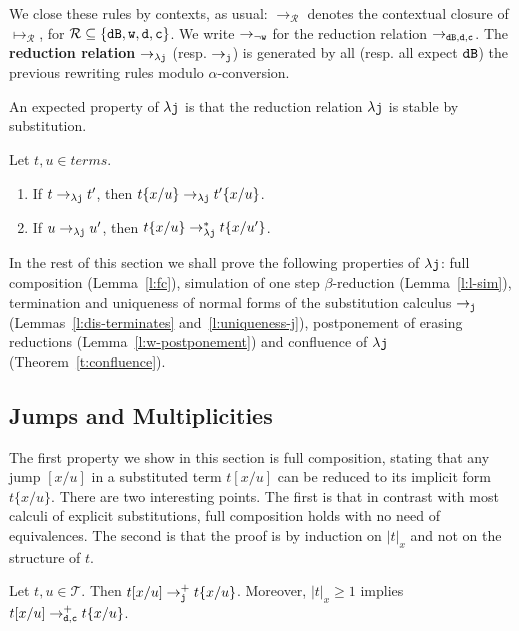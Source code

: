 \documentclass{LMCS}
\renewcommand{\>}{\rightarrow}
\def\lam{\lambda}
\newcommand{\Rew}[1]{\rightarrow_{#1}}
\newcommand{\rRew}[1]{\mapsto_{#1}}
\newcommand{\Rewn}[2][*]{\rightarrow^{#1}_{#2}}
\newcommand{\isubs}[1]{ \{ #1  \} }
\newcommand{\B}{{\tt dB}}
\newcommand{\R}{\mathcal{R}}
\newcommand{\dis}{{\tt j}}
\newcommand{\ldis}{\lam{\dis}}
\newcommand{\lj}{\lam{\dis}}
\newcommand{\Rewplus}[1]{\rightarrow^{+}_{#1}}
\newcommand{\Var}{{\tt d}}
\newcommand{\DSubs}{{\tt c}}
\newcommand{\Gc}{{\tt w}}
\newcommand{\set}[1]{ \{ #1 \}}
\newcommand{\terms}{\mathcal{T}}
\newcommand{\deft}[1]{{\bf #1}}
\newcommand{\nGc}{{\neg\Gc}}
\begin{document}
We close these rules by contexts, as usual:
$\Rew{\R}$ denotes the contextual closure of $\rRew{\R}$, for $\R
\subseteq \set{\B,\Gc,\Var,\DSubs}$. We write $\Rew{\nGc}$ for the
reduction relation $\Rew{\B,\Var,\DSubs}$.  The \deft{reduction
  relation} $\Rew{\ldis}$ (resp.  $\Rew{\dis}$) is generated by all
(resp.  all expect $\B$) the previous rewriting rules modulo
$\alpha$-conversion. \medskip


An expected property of $\lj$ is that the reduction relation $\ldis$ is  stable by substitution. 
\begin{lem} Let $t, u \in terms$.
\begin{enumerate}[$\bullet$]
\item If $t \Rew{\ldis} t'$, then $t\isubs{x/u} \Rew{\ldis}t'\isubs{x/u}$. 
\item If $u \Rew{\ldis} u'$, then $t\isubs{x/u} \Rewn{\ldis}t\isubs{x/u'}$. 
\end{enumerate}
\end{lem}


In the rest of this section we shall prove the following properties of $\ldis$:
full composition (Lemma~\ref{l:fc}), 
simulation of one step $\beta$-reduction (Lemma~\ref{l:l-sim}),
termination and uniqueness of normal forms of the  substitution calculus $\Rew{\dis}$
(Lemmas~\ref{l:dis-terminates} and~\ref{l:uniqueness-j}),
postponement of erasing reductions (Lemma~\ref{l:w-postponement})
and confluence of $\ldis$ (Theorem~\ref{t:confluence}).



\subsection{Jumps and Multiplicities}
\label{ss:struct-subs-and-mul}
The first property we show in this section 
is full composition, stating  that any 
jump $[x/u]$ in a substituted term  $t[x/u]$ can be
reduced to its implicit form $t\isubs{x/u}$.  There are two
  interesting points. The first is that in contrast with most calculi
  of explicit substitutions, full composition holds with no need of
  equivalences. The second is that the proof is by
  induction on $|t|_x$ and not on the structure of $t$.

\begin{lem}
\label{l:fc}
Let  $t,  u  \in \terms$.  Then  $t[x/u]
\Rewplus{\dis}  t\isubs{x/u}$. Moreover, $|t|_{x}  \geq  1$ implies
$t[x/u] \Rewplus{\Var,\DSubs} t\isubs{x/u}$.
\end{lem}
\end{document}
